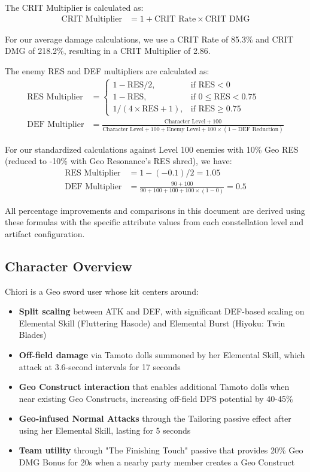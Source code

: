 \documentclass[12pt,a4paper]{article}
\begin{document}
The CRIT Multiplier is calculated as:
\begin{align}
\text{CRIT Multiplier} &= 1 + \text{CRIT Rate} \times \text{CRIT DMG}
\end{align}

For our average damage calculations, we use a CRIT Rate of 85.3\% and CRIT DMG of 218.2\%, resulting in a CRIT Multiplier of 2.86.

The enemy RES and DEF multipliers are calculated as:
\begin{align}
\text{RES Multiplier} &= 
\begin{cases} 
1 - \text{RES}/2, & \text{if RES} < 0 \\
1 - \text{RES}, & \text{if } 0 \leq \text{RES} < 0.75 \\
1/(4 \times \text{RES} + 1), & \text{if RES} \geq 0.75
\end{cases} \\
\text{DEF Multiplier} &= \frac{\text{Character Level} + 100}{\text{Character Level} + 100 + \text{Enemy Level} + 100 \times (1 - \text{DEF Reduction})}
\end{align}

For our standardized calculations against Level 100 enemies with 10\% Geo RES (reduced to -10\% with Geo Resonance's RES shred), we have:
\begin{align}
\text{RES Multiplier} &= 1 - (-0.1)/2 = 1.05 \\
\text{DEF Multiplier} &= \frac{90 + 100}{90 + 100 + 100 + 100 \times (1 - 0)} = 0.5
\end{align}

All percentage improvements and comparisons in this document are derived using these formulas with the specific attribute values from each constellation level and artifact configuration.

\subsection{Character Overview}

Chiori is a Geo sword user whose kit centers around:

\begin{itemize}
    \item \textbf{Split scaling} between ATK and DEF, with significant DEF-based scaling on Elemental Skill (Fluttering Hasode) and Elemental Burst (Hiyoku: Twin Blades)
    \item \textbf{Off-field damage} via Tamoto dolls summoned by her Elemental Skill, which attack at 3.6-second intervals for 17 seconds
    \item \textbf{Geo Construct interaction} that enables additional Tamoto dolls when near existing Geo Constructs, increasing off-field DPS potential by 40-45\%
    \item \textbf{Geo-infused Normal Attacks} through the Tailoring passive effect after using her Elemental Skill, lasting for 5 seconds
    \item \textbf{Team utility} through "The Finishing Touch" passive that provides 20\% Geo DMG Bonus for 20s when a nearby party member creates a Geo Construct
\end{itemize}
\end{document}

